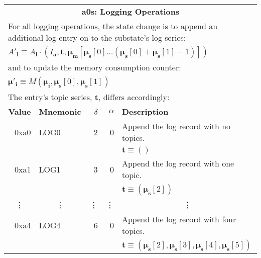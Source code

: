 \documentclass[9pt,oneside]{amsart}
\begin{document}
\begin{tabularx}{\textwidth}{rlrrX}
\toprule
\multicolumn{5}{c}{\textbf{a0s: Logging Operations}} \vspace{5pt} \\
\multicolumn{5}{l}{For all logging operations, the state change is to append an additional log entry on to the substate's log series:}\\
\multicolumn{5}{l}{$A'_\mathbf{l} \equiv A_\mathbf{l} \cdot (I_\mathbf{a}, \mathbf{t}, \boldsymbol{\mu}_\mathbf{m}[ \boldsymbol{\mu}_\mathbf{s}[0] \dots (\boldsymbol{\mu}_\mathbf{s}[0] + \boldsymbol{\mu}_\mathbf{s}[1] - 1) ])$}\\
\multicolumn{5}{l}{and to update the memory consumption counter:}\\
\multicolumn{5}{l}{$\boldsymbol{\mu}'_\mathbf{i} \equiv M(\boldsymbol{\mu}_\mathbf{i}, \boldsymbol{\mu}_\mathbf{s}[0], \boldsymbol{\mu}_\mathbf{s}[1])$}\\
\multicolumn{5}{l}{The entry's topic series, $\mathbf{t}$, differs accordingly:}\vspace{5pt} \\
\textbf{Value} & \textbf{Mnemonic} & $\delta$ & $\alpha$ & \textbf{Description} \vspace{5pt} \\
0xa0 & {\small LOG0} & 2 & 0 & Append the log record with no topics. \\
&&&& $\mathbf{t} \equiv ()$ \\
\midrule
0xa1 & {\small LOG1} & 3 & 0 & Append the log record with one topic. \\
&&&& $\mathbf{t} \equiv (\boldsymbol{\mu}_\mathbf{s}[2])$ \\
\midrule
\multicolumn{1}{c}{\vdots} & \multicolumn{1}{c}{\vdots} & \vdots & \vdots & \multicolumn{1}{c}{\vdots} \\
\midrule
0xa4 & {\small LOG4} & 6 & 0 & Append the log record with four topics. \\
&&&& $\mathbf{t} \equiv (\boldsymbol{\mu}_\mathbf{s}[2], \boldsymbol{\mu}_\mathbf{s}[3], \boldsymbol{\mu}_\mathbf{s}[4], \boldsymbol{\mu}_\mathbf{s}[5])$ \\
\bottomrule
\end{tabularx}
\end{document}
